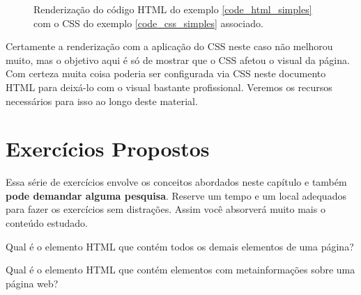 \begin{figure}[htbp!]
    \centering
    \caption{Renderização do código HTML do exemplo \ref{code_html_simples} com o CSS do exemplo \ref{code_css_simples} associado.}
    \label{fig:rend_html_com_css}
\end{figure}

Certamente a renderização com a aplicação do CSS neste caso não melhorou muito, mas o objetivo aqui é só de mostrar que o CSS afetou o visual da página. Com certeza muita coisa poderia ser configurada via CSS neste documento HTML para deixá-lo com o visual bastante profissional. Veremos os recursos necessários para isso ao longo deste material.

\section{Exercícios Propostos}

Essa série de exercícios envolve os conceitos abordados neste capítulo e também \textbf{pode demandar alguma pesquisa}. Reserve um tempo e um local adequados para fazer os exercícios sem distrações. Assim você absorverá muito mais o conteúdo estudado.

\begin{exercise}
Qual é o elemento HTML que contém todos os demais elementos de uma página?
\end{exercise}

\begin{exercise}
Qual é o elemento HTML que contém elementos com metainformações sobre uma página web?
\end{exercise}

